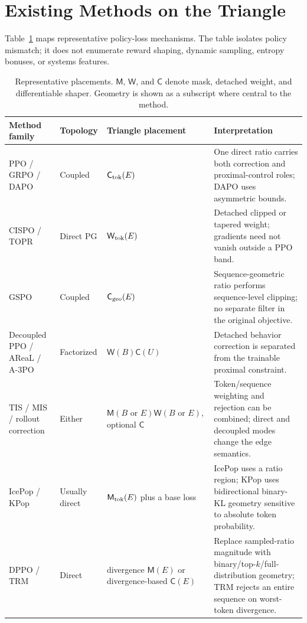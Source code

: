 \documentclass[10pt,twocolumn]{article}
\newcommand{\B}{B}
\newcommand{\U}{U}
\newcommand{\E}{E}
\newcommand{\Mask}{\mathsf{M}}
\newcommand{\Weight}{\mathsf{W}}
\newcommand{\Shape}{\mathsf{C}}
\begin{document}
\section{Existing Methods on the Triangle}
\label{sec:methods}

Table~\ref{tab:methods} maps representative policy-loss mechanisms.  The table isolates policy mismatch; it does not enumerate reward shaping, dynamic sampling, entropy bonuses, or systems features.

\begin{table}[t]
\centering
\caption{Representative placements.  \(\Mask\), \(\Weight\), and \(\Shape\) denote mask, detached weight, and differentiable shaper.  Geometry is shown as a subscript where central to the method.}
\label{tab:methods}
\small
\begin{tabular}{@{}p{}p{}p{}p{}@{}}
\toprule
Method family & Topology & Triangle placement & Interpretation \\
\midrule
PPO / GRPO / DAPO \citep{schulman2017ppo,shao2024deepseekmath,yu2025dapo}
& Coupled & \(\Shape_{\rm tok}(\E)\) & One direct ratio carries both correction and proximal-control roles; DAPO uses asymmetric bounds.\\

CISPO / TOPR \citep{minimax2025m1,leroux2025topr}
& Direct PG & \(\Weight_{\rm tok}(\E)\) & Detached clipped or tapered weight; gradients need not vanish outside a PPO band.\\

GSPO \citep{zheng2025gspo}
& Coupled & \(\Shape_{\rm geo}(\E)\) & Sequence-geometric ratio performs sequence-level clipping; no separate filter in the original objective.\\

Decoupled PPO / AReaL / A-3PO \citep{hilton2022batch,fu2025areal,li2025a3po}
& Factorized & \(\Weight(\B)\Shape(\U)\) & Detached behavior correction is separated from the trainable proximal constraint.\\

TIS / MIS / rollout correction \citep{ionides2008tis,verl2026rolloutcorr,qiu2026fp8rl}
& Either & \(\Mask(\B\text{ or }\E)\Weight(\B\text{ or }\E)\), optional \(\Shape\) & Token/sequence weighting and rejection can be combined; direct and decoupled modes change the edge semantics.\\

IcePop / KPop \citep{lingteam2025ring1t,kpop2026}
& Usually direct & \(\Mask_{\rm tok}(\E)\) plus a base loss & IcePop uses a ratio region; KPop uses bidirectional binary-KL geometry sensitive to absolute token probability.\\

DPPO / TRM \citep{qi2026dppo,li2025trm}
& Direct & divergence \(\Mask(\E)\) or divergence-based \(\Shape(\E)\) & Replace sampled-ratio magnitude with binary/top-\(k\)/full-distribution geometry; TRM rejects an entire sequence on worst-token divergence.\\
\bottomrule
\end{tabular}
\end{table}
\end{document}
